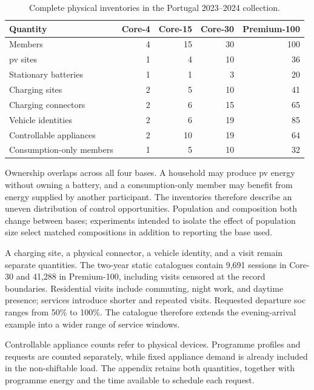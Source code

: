\begin{table}[!htbp]
\centering\small
\caption{Complete physical inventories in the Portugal 2023--2024 collection.}
\label{tab:sim-annual-suite-composition}
\begin{tabularx}{\textwidth}{@{}Xrrrr@{}}
\toprule
\textbf{Quantity} & \textbf{Core-4} & \textbf{Core-15} & \textbf{Core-30} & \textbf{Premium-100}\\
\midrule
Members & 4 & 15 & 30 & 100\\
\gls{pv} sites & 1 & 4 & 10 & 36\\
Stationary batteries & 1 & 1 & 3 & 20\\
Charging sites & 2 & 5 & 10 & 41\\
Charging connectors & 2 & 6 & 15 & 65\\
Vehicle identities & 2 & 6 & 19 & 85\\
Controllable appliances & 2 & 10 & 19 & 64\\
Consumption-only members & 1 & 5 & 10 & 32\\
\bottomrule
\end{tabularx}
\end{table}

Ownership overlaps across all four bases. A household may produce \gls{pv} energy without owning a battery, and a consumption-only member may benefit from energy supplied by another participant. The inventories therefore describe an uneven distribution of control opportunities. Population and composition both change between bases; experiments intended to isolate the effect of population size select matched compositions in addition to reporting the base used.

A charging site, a physical connector, a vehicle identity, and a visit remain separate quantities. The two-year static catalogues contain 9,691 sessions in Core-30 and 41,288 in Premium-100, including visits censored at the record boundaries. Residential visits include commuting, night work, and daytime presence; services introduce shorter and repeated visits. Requested departure \gls{soc} ranges from 50\% to 100\%. The catalogue therefore extends the evening-arrival example into a wider range of service windows.

Controllable appliance counts refer to physical devices. Programme profiles and requests are counted separately, while fixed appliance demand is already included in the non-shiftable load. The appendix retains both quantities, together with programme energy and the time available to schedule each request.

